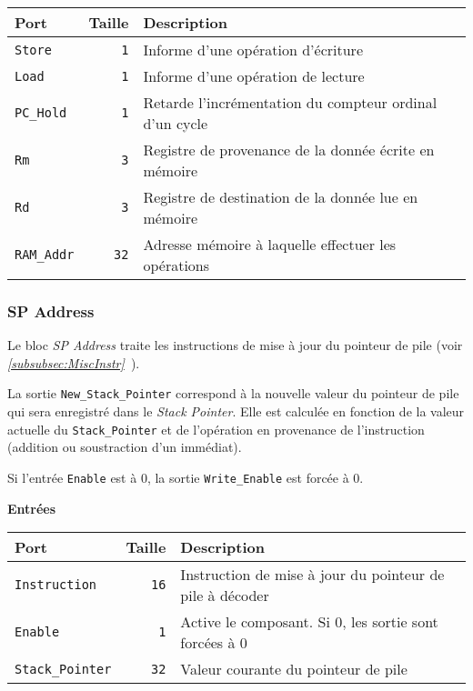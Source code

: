 \begin{tabular}{|l|r|l|}
\hline 
\textbf{Port} & \textbf{Taille} & \textbf{Description}\\
\hline

\texttt{Store}		&  \texttt{1} & Informe d'une opération d'écriture\\
\hline
\texttt{Load}		&  \texttt{1} & Informe d'une opération de lecture\\
\hline
\texttt{PC\_Hold}	&  \texttt{1} & Retarde l'incrémentation du compteur ordinal d'un cycle\\
\hline
\texttt{Rm}		&  \texttt{3} & Registre de provenance de la donnée écrite en mémoire\\
\hline
\texttt{Rd}		&  \texttt{3} & Registre de destination de la donnée lue en mémoire\\
\hline
\texttt{RAM\_Addr}	& \texttt{32} & Adresse mémoire à laquelle effectuer les opérations\\

\hline
\end{tabular}




\subsubsection{SP Address}


Le bloc \textit{SP Address} traite les instructions de mise à jour du pointeur de pile (voir \textit{\ref{subsubsec:MiscInstr}~}).

La sortie \texttt{New\_Stack\_Pointer} correspond à la nouvelle valeur du pointeur de pile qui sera enregistré dans le \textit{Stack Pointer}.
Elle est calculée en fonction de la valeur actuelle du \texttt{Stack\_Pointer} et de l'opération en provenance de l'instruction (addition ou soustraction d'un immédiat).

Si l'entrée \texttt{Enable} est à 0, la sortie \texttt{Write\_Enable} est forcée à 0.


\textbf{Entrées}\\

\begin{tabular}{|l|r|l|}
\hline
\textbf{Port}		& \textbf{Taille} & \textbf{Description}\\
\hline

\texttt{Instruction}	& \texttt{16} & Instruction de mise à jour du pointeur de pile à décoder\\
\hline
\texttt{Enable}		&  \texttt{1} & Active le composant. Si 0, les sortie sont forcées à 0\\
\hline
\texttt{Stack\_Pointer}	& \texttt{32} & Valeur courante du pointeur de pile\\

\hline
\end{tabular}

